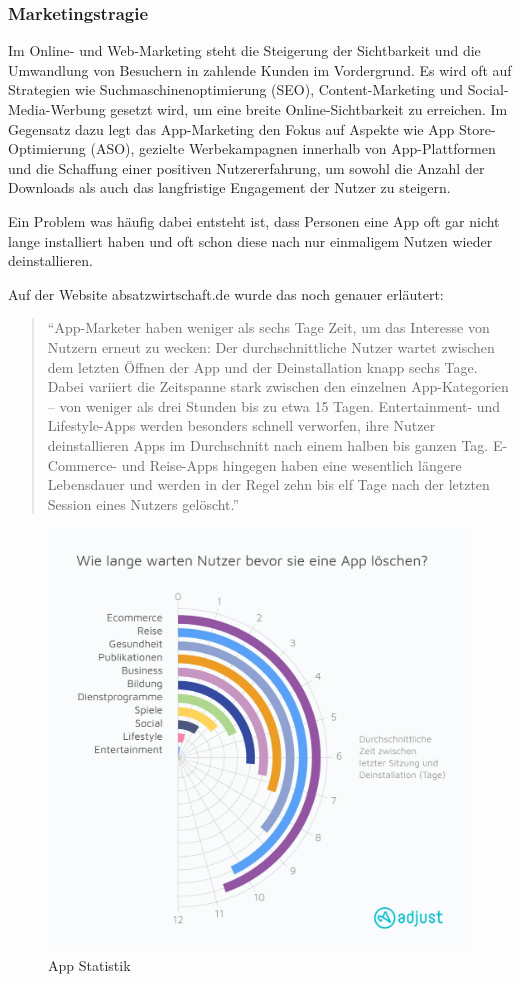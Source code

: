 \subsubsection{Marketingstragie}

Im Online- und Web-Marketing steht die Steigerung der Sichtbarkeit und die Umwandlung von Besuchern in zahlende 
Kunden im Vordergrund. Es wird oft auf Strategien wie Suchmaschinenoptimierung (SEO), Content-Marketing und 
Social-Media-Werbung gesetzt wird, um eine breite Online-Sichtbarkeit zu erreichen. Im Gegensatz dazu legt das 
App-Marketing den Fokus auf Aspekte wie App Store-Optimierung (ASO), gezielte 
Werbekampagnen innerhalb von App-Plattformen und die Schaffung einer positiven Nutzererfahrung, um sowohl die Anzahl 
der Downloads als auch das langfristige Engagement der Nutzer zu steigern.
\cite{marketingstrategie} 

Ein Problem was häufig dabei entsteht ist, dass Personen eine App oft gar nicht lange installiert haben und oft schon 
diese nach nur einmaligem Nutzen wieder deinstallieren.

Auf der Website absatzwirtschaft.de wurde das noch genauer erläutert: \cite{deinstallieren}

\begin{quotation}
"`App-Marketer haben weniger als sechs Tage Zeit, um das Interesse von Nutzern erneut zu wecken: Der durchschnittliche
Nutzer wartet zwischen dem letzten Öffnen der App und der Deinstallation knapp sechs Tage. Dabei variiert die
Zeitspanne stark zwischen den einzelnen App-Kategorien – von weniger als drei Stunden bis zu etwa 15 Tagen.
Entertainment- und Lifestyle-Apps werden besonders schnell verworfen, ihre Nutzer deinstallieren Apps im Durchschnitt 
nach einem halben bis ganzen Tag. E-Commerce- und Reise-Apps hingegen haben eine wesentlich längere Lebensdauer und 
werden in der Regel zehn bis elf Tage nach der letzten Session eines Nutzers gelöscht."' 
\end{quotation}

\begin{figure}[H]
    \centering
    \includegraphics[height=\textwidth]{./pics/deinstallieren.png}
    \caption{App Statistik \cite{deinstallieren}}
\end{figure}
